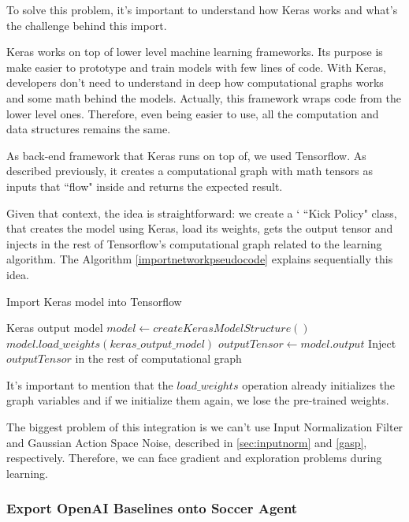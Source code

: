 To solve this problem, it's important to understand how Keras works and what's the challenge behind this import. 

Keras works on top of lower level machine learning frameworks. Its purpose is make easier to prototype and train models with few lines of code. With Keras, developers don't need to understand in deep how computational graphs works and some math behind the models. Actually, this framework wraps code from the lower level ones. Therefore, even being easier to use, all the computation and data structures remains the same.

As back-end framework that Keras runs on top of, we used Tensorflow. As described previously, it creates a computational graph with math tensors as inputs that ``flow" inside and returns the expected result.

Given that context, the idea is straightforward: we create a `    ``Kick Policy" class, that creates the model using Keras, load its weights, gets the output tensor and injects in the rest of Tensorflow's computational graph related to the learning algorithm. The Algorithm \ref{importnetworkpseudocode} explains sequentially this idea.

\begin{algorithm}
	\caption{Import Keras model into Tensorflow}
	\begin{algorithmic} 
		\REQUIRE Keras output model
		\STATE $model \leftarrow createKerasModelStructure()$
		\STATE $model.load\_weights(keras\_output\_model)$
		\STATE $outputTensor \leftarrow model.output$
		\STATE Inject $outputTensor$ in the rest of computational graph
	\end{algorithmic}
	\label{importnetworkpseudocode}
\end{algorithm}

It's important to mention that the $load\_weights$ operation already initializes the graph variables and if we initialize them again, we lose the pre-trained weights.

The biggest problem of this integration is we can't use Input Normalization Filter and Gaussian Action Space Noise, described in \ref{sec:inputnorm} and \ref{gasp}, respectively. Therefore, we can face gradient and exploration problems during learning.

\subsubsection{Export OpenAI Baselines onto Soccer Agent}

